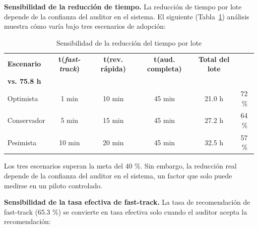  \textbf{Sensibilidad de la reducción de tiempo.} La reducción de tiempo por lote depende de la confianza del auditor en el sistema. El siguiente (Tabla~\ref{tab:sensibilidad-reduccion-tiempo}) análisis muestra cómo varía bajo tres escenarios de adopción:

\begin{table}[H]
    \centering
    \caption{Sensibilidad de la reducción del tiempo por lote}
    \label{tab:sensibilidad-reduccion-tiempo}

    \footnotesize
    \setlength{\tabcolsep}{5pt}
    \renewcommand{\arraystretch}{1.25}

    \begin{tabular}{
        l
        c
        c
        c
        c
        c
    }
        \toprule
        \textbf{Escenario}
        & \textbf{t(\textit{fast-track})}
        & \textbf{t(rev. rápida)}
        & \textbf{t(aud. completa)}
        & \textbf{Total del lote}
        & \shortstack{\textbf{Reducción}\\\textbf{vs. 75.8 h}} \\
        \midrule

        Optimista
        & 1 min
        & 10 min
        & 45 min
        & 21.0 h
        & 72\,\% \\

        Conservador
        & 5 min
        & 15 min
        & 45 min
        & 27.2 h
        & 64\,\% \\

        Pesimista
        & 10 min
        & 20 min
        & 45 min
        & 32.5 h
        & 57\,\% \\

        \bottomrule
    \end{tabular}
\end{table}

Los tres escenarios superan la meta del 40 \%. Sin embargo, la reducción real depende de la confianza del auditor en el sistema, un factor que solo puede medirse en un piloto controlado.

 \textbf{Sensibilidad de la tasa efectiva de fast-track.} La tasa de recomendación de fast-track (65.3 \%) se convierte en tasa efectiva solo cuando el auditor acepta la recomendación:

